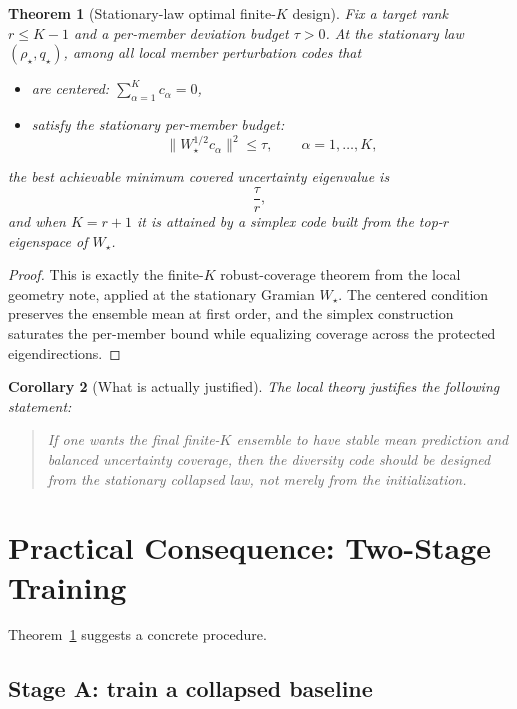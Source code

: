 \documentclass[11pt]{article}
\newtheorem{theorem}{Theorem}
\newtheorem{corollary}[theorem]{Corollary}
\theoremstyle{remark}
\begin{document}
\begin{theorem}[Stationary-law optimal finite-$K$ design]
\label{thm:stationary-law-opt}
Fix a target rank $r\le K-1$ and a per-member deviation budget $\tau>0$. At the stationary law $(\rho_\star,q_\star)$, among all local member perturbation codes that
\begin{itemize}
\item are centered: $\sum_{\alpha=1}^K c_\alpha=0$,
\item satisfy the stationary per-member budget:
\[
\|W_\star^{1/2}c_\alpha\|^2\le \tau,
\qquad
\alpha=1,\dots,K,
\]
\end{itemize}
the best achievable minimum covered uncertainty eigenvalue is
\[
\frac{\tau}{r},
\]
and when $K=r+1$ it is attained by a simplex code built from the top-$r$ eigenspace of $W_\star$.
\end{theorem}

\begin{proof}
This is exactly the finite-$K$ robust-coverage theorem from the local geometry note, applied at the stationary Gramian $W_\star$. The centered condition preserves the ensemble mean at first order, and the simplex construction saturates the per-member bound while equalizing coverage across the protected eigendirections.
\end{proof}

\begin{corollary}[What is actually justified]
\label{cor:what-justified}
The local theory justifies the following statement:

\begin{quote}
If one wants the \emph{final} finite-$K$ ensemble to have stable mean prediction and balanced uncertainty coverage, then the diversity code should be designed from the stationary collapsed law, not merely from the initialization.
\end{quote}
\end{corollary}

\section{Practical Consequence: Two-Stage Training}

Theorem~\ref{thm:stationary-law-opt} suggests a concrete procedure.

\subsection*{Stage A: train a collapsed baseline}
\end{document}
